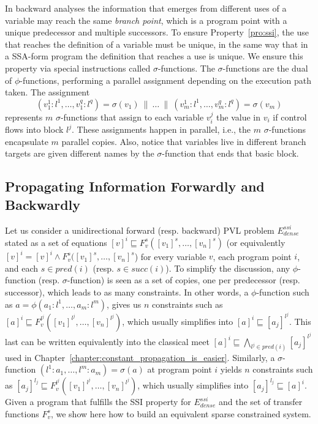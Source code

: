 In backward analyses the information that emerges from different uses of a variable may reach the same {\em branch point}, which is a program point with a unique predecessor and multiple successors.
To ensure Property~\ref{pro:ssi}, the use that reaches the definition of a
variable must be unique, in the same way that in a SSA-form program the definition that reaches a use is unique.
We ensure this property via special instructions called $\sigma$-functions.
The $\sigma$-functions are the dual of $\phi$-functions, performing a parallel assignment depending on the execution path taken.
The assignment \[(v_1^1:l^1, \ldots, v_1^q:l^q) = \sigma(v_1) \ \parallel\  \dots \ \parallel\  (v_m^1:l^1, \ldots, v_m^q:l^q) = \sigma(v_m)\] represents $m$ $\sigma$-functions that assign to each variable $v_i^j$ the value in $v_i$ if control flows into block $l^j$.
These assignments happen in parallel, i.e., the $m$ $\sigma$-functions encapsulate $m$ parallel copies.
Also, notice that variables live in different branch targets are given
different names by the $\sigma$-function that ends that basic block.

\subsection{Propagating Information Forwardly and Backwardly}
\label{sec:ssi:pereira:engine}

Let us consider a unidirectional forward (resp. backward) PVL problem $E^{ssi}_{\mathit{dense}}$ stated as a set of equations $[v]^i \sqsubseteq  F_v^s([v_1]^s, \dots, [v_n]^s)$ (or equivalently $[v]^i = [v]^i \wedge    F_v^s([v_1]^s, \dots, [v_n]^s$) for every variable $v$, each program point $i$, and each $s \in \mathit{pred}(i)$ (resp. $s \in \mathit{succ}(i)$). 
To simplify the discussion, any $\phi$-function (resp. $\sigma$-function) is seen as a set of copies, one per predecessor (resp. successor), which leads to as many constraints.
In other words, a $\phi$-function such as $a=\phi(a_1:l^1,\dots,a_m:l^m)$, gives us $n$ constraints such as $[a]^i \sqsubseteq  F_v^{l^j}([v_1]^{l^j}, \dots, [v_n]^{l^j})$, which usually simplifies into $[a]^i \sqsubseteq [a_j]^{l^j}$. This last can be written equivalently into the classical meet $[a]^i \sqsubseteq \bigwedge_{l^j \in \mathit{pred}(i)} [a_j]^{l^j}$ used in Chapter~\ref{chapter:constant_propagation_is_easier}.
Similarly, a $\sigma$-function $(l^1:a_1,\dots,l^m:a_m)=\sigma(a)$ at program point $i$ yields $n$ constraints such as $[a_j]^{l_j} \sqsubseteq  F_v^{l^j}([v_1]^{l^j}, \dots, [v_n]^{l^j})$, which usually simplifies into $[a_j]^{l_j} \sqsubseteq [a]^i$.
Given a program that fulfills the SSI property for $E^{ssi}_{\mathit{dense}}$ and the set of transfer functions $F_v^s$, we show here how to build an equivalent sparse constrained system.  

